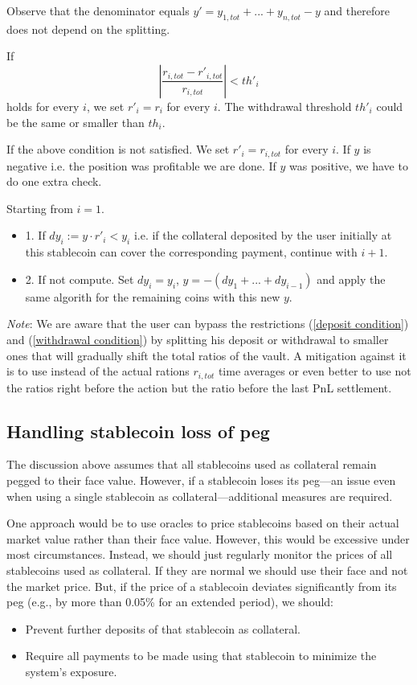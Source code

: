 \documentclass{article}
\begin{document}
Observe that the denominator equals $y'=y_{1,tot}+...+y_{n,tot}-y$ and therefore does not depend on the splitting.

If 
\begin{equation}
\left| \frac{r_{i,tot}-r'_{i,tot}}{r_{i,tot}}\right|< th'_i
\end{equation}
holds for every $i$, we set $r'_i=r_i$ for every $i$.
The withdrawal threshold $th'_i$ could be the same or smaller than $th_i$.

If the above condition is not satisfied. We set $r'_i=r_{i,tot}$ for every $i$. If $y$ is negative i.e. the position was profitable we are done. If $y$ was positive, we have to do one extra check.

Starting from $i=1$. 
\begin{itemize}
\item 1. If $dy_i:=y\cdot r'_i<y_i$ i.e. if the collateral deposited by the user initially at this stablecoin can cover the corresponding payment, continue with $i+1$.
\item 2. If not compute. Set $dy_i=y_i$, $y=-(dy_1+...+dy_{i-1})$ and apply the same algorith for the remaining coins with this new $y$.
\end{itemize}

\textit{Note}: We are aware that the user can bypass the restrictions (\ref{deposit condition}) and (\ref{withdrawal condition}) by splitting his deposit or withdrawal to smaller ones that will gradually shift the total ratios of the vault. A mitigation against it is to use instead of the actual rations $r_{i,tot}$ time averages or even better to use not the ratios right before the action but the ratio before the last PnL settlement.

\subsection{Handling stablecoin loss of peg}

The discussion above assumes that all stablecoins used as collateral remain pegged to their face value. However, if a stablecoin loses its peg—an issue even when using a single stablecoin as collateral—additional measures are required.

One approach would be to use oracles to price stablecoins based on their actual market value rather than their face value. However, this would be excessive under most circumstances. Instead, we should just regularly monitor the prices of all stablecoins used as collateral. If they are normal we should use their face and not the market price. But, if the price of a stablecoin deviates significantly from its peg (e.g., by more than 0.05\% for an extended period), we should:
\begin{itemize}
\item Prevent further deposits of that stablecoin as collateral.
\item Require all payments to be made using that stablecoin to minimize the system’s exposure.
\end{itemize}
\end{document}
